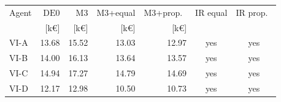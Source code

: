 \begin{tabular*}{\textwidth}{@{\extracolsep{\fill}}lrrrrcc@{}}
\toprule
Agent & $\mathrm{DE0}$ & $\mathrm{M3}$ & $\mathrm{M3}$+equal & $\mathrm{M3}$+prop.\ & IR equal & IR prop.\ \\
 & [k\euro] & [k\euro] & [k\euro] & [k\euro] & & \\
\midrule
VI-A & 13.68 & 15.52 & 13.03 & 12.97 & yes & yes \\
VI-B & 14.00 & 16.13 & 13.64 & 13.57 & yes & yes \\
VI-C & 14.94 & 17.27 & 14.79 & 14.69 & yes & yes \\
VI-D & 12.17 & 12.98 & 10.50 & 10.73 & yes & yes \\
\bottomrule
\end{tabular*}
